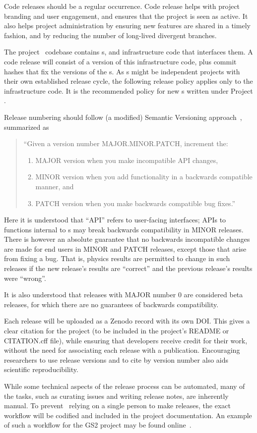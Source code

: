 Code releases should be a regular occurrence.
Code release helps with project branding and user engagement,
and ensures that the project is seen as active.
It also helps project administration by ensuring new features are shared in a timely fashion,
and by reducing the number of long-lived divergent branches. 

The project \nep\ codebase contains \papp s, and infrastructure code that interfaces them.
A code release will consist of a version of this infrastructure code, 
plus commit hashes that fix the versions of the \papp s.
As \papp s might be independent projects with their own established release cycle,
the following release policy applies only to the infrastructure code.
It is the recommended policy for new \papp s written under Project \nep.

Release numbering should follow (a modified) Semantic Versioning approach~\cite{semverwebsite}, summarized as
\begin{quote}
``Given a version number MAJOR.MINOR.PATCH, increment the:
\begin{enumerate}
  \item MAJOR version when you make incompatible API changes,
  \item MINOR version when you add functionality in a backwards compatible manner, and
  \item PATCH version when you make backwards compatible bug fixes.''
\end{enumerate}
\end{quote}
Here it is understood that ``API'' refers to user-facing interfaces;
APIs to functions internal to \papp s may break backwards compatibility in
MINOR releases.
There is however an absolute guarantee that no backwards incompatible changes
are made for end users in MINOR and PATCH releases, except those that arise
from fixing a bug.
That is, physics results are permitted to change in such releases if the new
release's results are ``correct'' and the previous release's results were
``wrong''.

It is also understood that releases with MAJOR number 0 are considered beta releases,
for which there are no guarantees of backwards compatibility.
 
Each release will be uploaded as a Zenodo\cite{zenodowebsite}
record with its own DOI.
This gives a clear citation for the project (to be included in the project's
README or CITATION.cff file),
while ensuring that developers receive credit for their work, without the need
for associating each release with a publication.
Encouraging researchers to use release versions and to cite by version number
also aids scientific reproducibility.

While some technical aspects of the release process can be automated,
many of the tasks, such as curating issues and writing release notes, are
inherently manual.
To prevent \nep\ relying on a single person to make releases,
the exact workflow will be codified and included in the project documentation.
An example of such a workflow for the GS2 project may be found
online~\cite{gs2website}.


